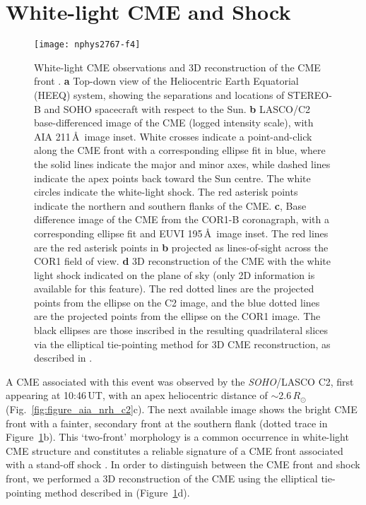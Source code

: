 \section{White-light CME and Shock}
\begin{figure}[!t]
\begin{center}
\texttt{[image: nphys2767-f4]}
\caption[3D reconstruction of CME and white-light shock]{White-light CME observations and 3D reconstruction of the CME front \citep{carley2013}. {\bf a} Top-down view of the Heliocentric Earth Equatorial (HEEQ) system, showing the separations and locations of STEREO-B and SOHO spacecraft with respect to the Sun. {\bf b} LASCO/C2 base-differenced image of the CME (logged intensity scale), with AIA 211\,\AA~image inset. White crosses indicate a point-and-click along the CME front with a corresponding ellipse fit in blue, where the solid lines indicate the major and minor axes, while dashed lines indicate the apex points back toward the Sun centre. The white circles indicate the white-light shock. The red asterisk points indicate the northern and southern flanks of the CME. {\bf c}, Base difference image of the CME from the COR1-B coronagraph, with a corresponding ellipse fit and EUVI 195\,\AA~image inset. The red lines are the red asterisk points in {\bf b} projected as lines-of-sight across the COR1 field of view. {\bf d} 3D reconstruction of the CME with the white light shock indicated on the plane of sky (only 2D information is available for this feature). The red dotted lines are the projected points from the ellipse on the C2 image, and the blue dotted lines are the projected points from the ellipse on the COR1 image. The black ellipses are those inscribed in the resulting quadrilateral slices via the elliptical tie-pointing method for 3D CME reconstruction, as described in \citep{byrne2010}.}
\label{fig:3d_cme}
\end{center}
\end{figure}
A CME associated with this event was observed by the \emph{SOHO}/LASCO C2, first appearing at 10:46\,UT, with an apex heliocentric distance of $\sim$2.6\,$R_{\odot}$ (Fig.~\ref{fig:figure_aia_nrh_c2}c). The next available image shows the bright CME front with a fainter, secondary front at the southern flank (dotted trace in Figure~\ref{fig:3d_cme}b). This `two-front' morphology is a common occurrence in white-light CME structure and constitutes a reliable signature of a CME front associated with a stand-off shock \citep{vourlidas2012}. In order to distinguish between the CME front and shock front, we performed a 3D reconstruction of the CME using the elliptical tie-pointing method described in \cite{byrne2010} (Figure~\ref{fig:3d_cme}d). 

